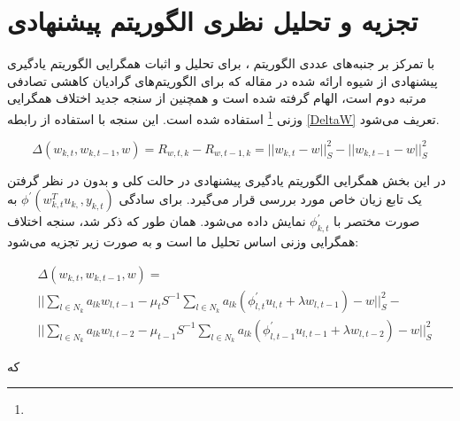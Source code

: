 \section{تجزیه و تحلیل نظری الگوریتم پیشنهادی}
با تمرکز بر جنبه‌های عددی الگوریتم ، برای تحلیل و اثبات همگرایی الگوریتم یادگیری پیشنهادی از شیوه ارائه شده در مقاله \cite{Zin2010} که برای الگوریتم‌های گرادیان کاهشی تصادفی مرتبه دوم است، الهام گرفته شده است و همچنین از سنجه جدید اختلاف همگرایی وزنی \footnote{} استفاده شده است. این سنجه با استفاده از رابطه \ref{DeltaW} تعریف می‌شود. 

\begin{equation}\label{DeltaW}
	\Delta(w_{k,t},w_{k,t-1},w)=R_{w,t,k}-R_{w,t-1,k}=\lvert\lvert w_{k,t}-w\rvert\rvert^2_S-\lvert\lvert w_{k,t-1}-w\rvert\rvert^2_S
\end{equation}

در این بخش همگرایی الگوریتم یادگیری پیشنهادی در حالت کلی و بدون در نظر گرفتن یک تابع زیان خاص مورد بررسی قرار می‌گیرد. برای سادگی $\phi^{'}(w_{k,t}^T u_{k,},y_{k,t})$ به صورت مختصر با $\phi^{'}_{k,t}$ نمایش داده می‌شود. همان طور که ذکر شد، سنجه اختلاف همگرایی وزنی اساس تحلیل ما است و به صورت زیر تجزیه می‌شود:

\begin{equation}\label{decompositionF}
	\begin{split}
		&\Delta(w_{k,t},w_{k,t-1},w)=\\
		& \lvert\lvert\sum_{l\in N_k} a_{lk}w_{l,t-1}-\mu_{t} S^{-1} \sum_{l\in N_k} a_{lk}\left(\phi^{'}_{l,t}u_{l,t}+\lambda w_{l,t-1}\right)-w\rvert\rvert^2_S-\\
		&\lvert\lvert\sum_{l\in N_k} a_{lk}w_{l,t-2}-\mu_{t-1} S^{-1} \sum_{l\in N_k} a_{lk}\left(\phi^{'}_{l,t-1}u_{l,{t-1}}+\lambda w_{l,t-2}\right)-w\rvert\rvert^2_S
	\end{split}
\end{equation}

که 

